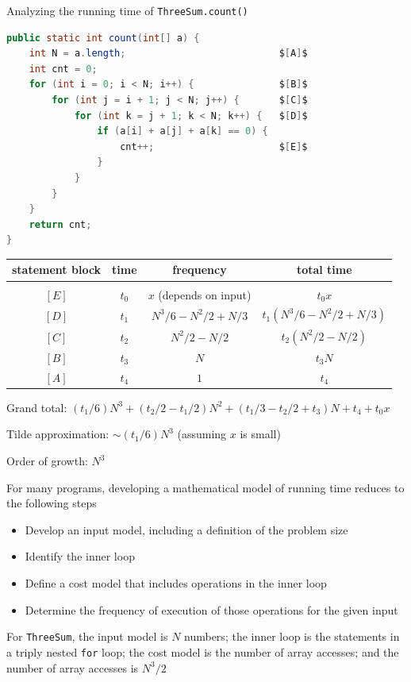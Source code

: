 \documentclass[8pt,a4paper,compress]{beamer}
\begin{document}
\begin{frame}[fragile]
\pause

Analyzing the running time of \lstinline{ThreeSum.count()}
\begin{lstlisting}[language=Java, mathescape]
public static int count(int[] a) {
    int N = a.length;                           $[A]$
    int cnt = 0;
    for (int i = 0; i < N; i++) {               $[B]$ 
        for (int j = i + 1; j < N; j++) {       $[C]$
            for (int k = j + 1; k < N; k++) {   $[D]$
                if (a[i] + a[j] + a[k] == 0) {
                    cnt++;                      $[E]$
                }
            }
        }
    }
    return cnt;
}
\end{lstlisting}

\pause

\begin{center}
\begin{tabular}{cccc}
statement block & time & frequency & total time\\ \hline \\
$[E]$ & $t_0$ & $x$ (depends on input) & $t_0x$ \\
$[D]$ & $t_1$ & $N^3/6-N^2/2+N/3$  & $t_1(N^3/6-N^2/2+N/3)$ \\
$[C]$ & $t_2$ & $N^2/2-N/2$  & $t_2(N^2/2-N/2)$ \\
$[B]$ & $t_3$ & $N$  & $t_3N$ \\
$[A]$ & $t_4$ & $1$  & $t_4$ 
\end{tabular} 
\end{center}

\pause

Grand total: $(t_1/6)N^3+(t_2/2-t_1/2)N^2+(t_1/3-t_2/2+t_3)N+t_4+t_0x$

\pause
\smallskip

Tilde approximation: $\sim(t_1/6)N^3$ (assuming $x$ is small)

\pause
\smallskip

Order of growth: $N^3$
\end{frame}

\begin{frame}[fragile]
\pause

For many programs, developing a mathematical model of running time reduces to the following steps
\begin{itemize}
\item Develop an input model, including a definition of the problem size
\item Identify the inner loop
\item Define a cost model that includes operations in the inner loop
\item Determine the frequency of execution of those operations for the given input
\end{itemize}

\pause
\bigskip

For \lstinline{ThreeSum}, the input model is $N$ numbers; the inner loop is the statements in a triply nested \lstinline{for} loop; the cost model is the number of array accesses; and the number of array accesses is $N^3/2$
\end{frame}
\end{document}
